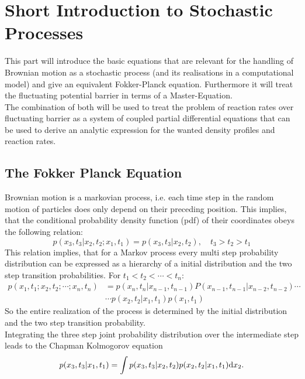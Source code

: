 
\section{Short Introduction to Stochastic Processes}

This part will introduce the basic equations that are relevant for the handling of Brownian motion as a stochastic process (and its realisations in a computational model) and give an equivalent Fokker-Planck equation. Furthermore it will treat the fluctuating potential barrier in terms of a Master-Equation. \\
The combination of both will be used to treat the problem of reaction rates over fluctuating barrier as a system of coupled partial differential equations that can be used to derive an analytic expression for the wanted density profiles and reaction rates.
\subsection{The Fokker Planck Equation}
\label{fpeq}
Brownian motion is a markovian process, i.e. each time step in the random motion of particles does only depend on their preceding position. This implies, that the conditional probability density function (pdf) of their coordinates obeys the following relation:
\begin{equation}
    p(x_{3},t_{3}|x_{2},t_{2};x_{1},t_{1}) = p(x_{3},t_{3}|x_{2},t_{2}), \quad t_{3}>t_{2}>t_{1}
    \label{}
\end{equation}
This relation implies, that for a Markov process every multi step probability distribution can be expressed as a hierarchy of a initial distribution and the two step transition probabilities. For $ t_1 < t_2 < \cdots < t_n$:
\begin{align}
    p(x_1,t_1;x_2,t_2;\cdots;x_n,t_n) &= p(x_n,t_n|x_{n-1},t_{n-1})P(x_{n-1},t_{n-1}|x_{n-2},t_{n-2}) \cdots \nonumber \\
                                      & \cdots p(x_2,t_2|x_1,t_1)p(x_1,t_1)
    \label{hierarchy}
\end{align}
So the entire realization of the process is determined by the initial distribution and the two step transition probability. \\
Integrating the three step joint probability distribution over the intermediate step leads to the Chapman Kolmogorov equation
\begin{equation}
    p(x_3,t_3|x_1,t_1) = \int p(x_3,t_3|x_2,t_2) p(x_2,t_2|x_1,t_1) {\rm d} x_2.
    \label{Chapman Kolmogorov equation}
\end{equation}
